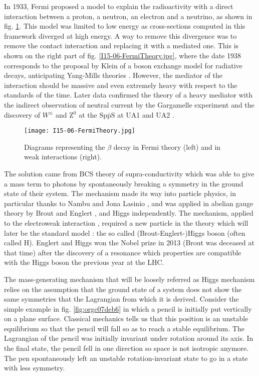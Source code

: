 In 1933, Fermi proposed a model \cite{Fermi:1933jpa,Fermi2008} to explain the radioactivity with a direct interaction between a proton, a neutron, an electron and a neutrino, as shown in fig. \ref{fig:orgfa8568d}.
This model was limited to low energy as cross-sections computed in this framework diverged at high energy.
A way to remove this divergence was to remove the contact interaction and replacing it with a mediated one.
This is shown on the right part of fig. \ref{I15-06-FermiTheory.jpg}, where the date 1938 corresponds to the proposal by Klein \cite{Klein:1938jm} of a boson exchange model for radiative decays, anticipating Yang-Mills theories \cite{Yang:1954ek}.
However, the mediator of the interaction should be massive and even extremely heavy with respect to the standards of the time.
Later data confirmed the theory of a heavy mediator with the indirect observation of neutral current by the Gargamelle experiment \cite{Gargamelle,Hasert:1973cr} and the discovery of \(W^{\pm}\) and Z\(^{\text{0}}\) at the \(\text{Sp}\bar{\text{p}}\text{S}\) at UA1 \cite{CERN-EP-83-13,1983398} and UA2 \cite{CERN-EP-83-25,CERN-EP-83-112}.

\begin{figure}[htbp]
\centering
\texttt{[image: I15-06-FermiTheory.jpg]}
\caption{\label{fig:orgfa8568d}
Diagrams representing the \(\beta\) decay in Fermi theory (left) and in weak interactions (right).}
\end{figure}


The solution came from BCS theory of supra-conductivity \cite{PhysRev.108.1175} which was able to give a mass term to photons by spontaneously breaking a symmetry in the ground state of their system.
The mechanism made its way into particle physics, in particular thanks to Nambu and Jona Lasinio \cite{Nambu:1961fr,Nambu:1961tp,Nambu:1960xd,Nambu:1960tm}, and was applied in abelian gauge theory by Brout and Englert \cite{BroutEnglert}, and Higgs \cite{Higgs64} independently.
The mechanism, applied to the electroweak interaction \cite{PhysRevLett.19.1264,SALAM1964168}, required a new particle in the theory which will later be the standard model : the so called (Brout-Englert-)Higgs boson (often called H).
Englert and Higgs won the Nobel prize in 2013 (Brout was deceased at that time) after the discovery \cite{CERN-PH-EP-2012-218,CERN-PH-EP-2012-220} of a resonance which properties are compatible with the Higgs boson the previous year at the LHC.


The mass-generating mechanism that will be loosely referred as Higgs mechanism relies on the assumption that the ground state of a system does not show the same symmetries that the Lagrangian from which it is derived.
Consider the simple example in fig. \ref{fig:orgc07deb6} in which a pencil is initially put vertically on a plane surface.
Classical mechanics tells us that this position is an unstable equilibrium so that the pencil will fall so as to reach a stable equilibrium.
The Lagrangian of the pencil was initially invariant under rotation around its axis.
In the final state, the pencil fell in one direction so space is not isotropic anymore.
The pen spontaneously left an unstable rotation-invariant state to go in a state with less symmetry.

